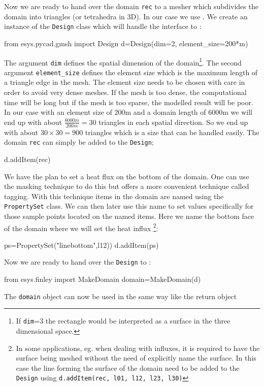 Now we are ready to hand over the domain \verb|rec| to a mesher which
subdivides the domain into triangles (or tetrahedra in 3D). In our case we use
\gmsh. We create an instance of the \verb|Design| class which will handle the
interface to \gmsh: 
\begin{python}
from esys.pycad.gmsh import Design 
d=Design(dim=2, element_size=200*m)
\end{python}
The argument \verb|dim| defines the spatial dimension of the domain\footnote{If
\texttt{dim}=3 the rectangle would be interpreted as a surface in the three
dimensional space.}. The second argument \verb|element_size| defines the element
size which is the maximum length of a triangle edge in the mesh. The element
size needs to be chosen with care in order to avoid very dense meshes. If the
mesh is too dense, the computational time will be long but if the mesh is too
sparse, the modelled result will be poor. In our case with an element size of
$200$m and a domain length of $6000$m we will end up with about $\frac{6000m}{200m}=30$
triangles in each spatial direction. So we end up with about $30 \times 30 =
900$ triangles which is a size that can be handled easily.
The domain \verb|rec| can simply be added to the \verb|Design|;
\begin{python}
d.addItem(rec)
\end{python}
We have the plan to set a heat flux on the bottom of the domain. One can use
the masking technique to do this but \pycad offers a more convenient technique
called tagging. With this technique items in the domain are named using the
\verb|PropertySet| class. We can then later use this name to set values
specifically for those sample points located on the named items. Here we name
the bottom face of the domain where we will set the heat influx
\footnote{In some applications, eg.
when dealing with influxes,
it is required to have the surface being meshed without the need of explicitly
name the surface. In this case the line forming the surface of the domain need to be
added to the \texttt{Design} 
using \texttt{d.addItem(rec, l01, l12, l23, l30)}}:
\begin{python}
ps=PropertySet("linebottom",l12))
d.addItem(ps)
\end{python}
Now we are ready to hand over the \verb|Design| to \FINLEY:
\begin{python}
from esys.finley import MakeDomain
domain=MakeDomain(d)
\end{python}
The \verb|domain| object can now be used in the same way like the return object
